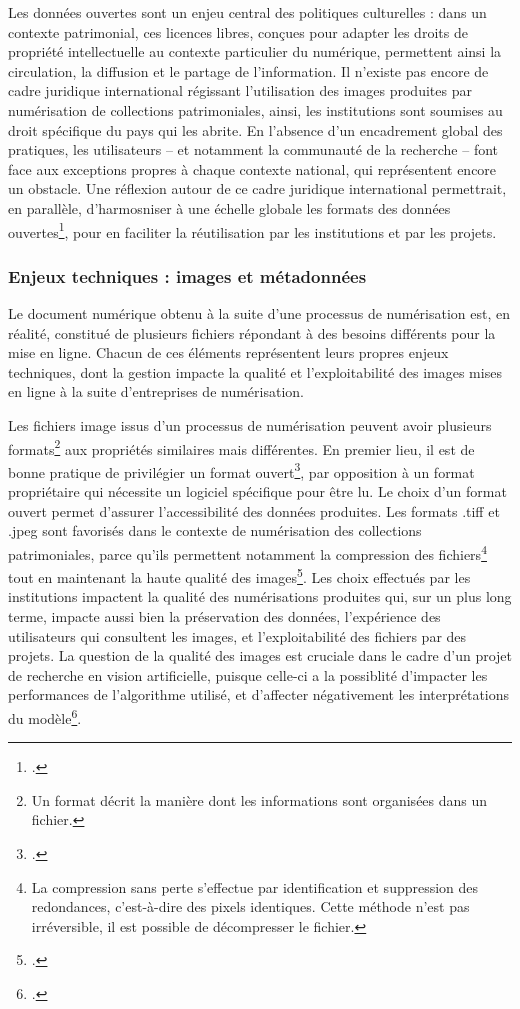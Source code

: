 Les données ouvertes sont un enjeu central des politiques culturelles : dans un contexte patrimonial, ces licences libres, conçues pour adapter les droits de propriété intellectuelle au contexte particulier du numérique, permettent ainsi la circulation, la diffusion et le partage de l'information. Il n'existe pas encore de cadre juridique international régissant l'utilisation des images produites par numérisation de collections patrimoniales, ainsi, les institutions sont soumises au droit spécifique du pays qui les abrite. En l'absence d'un encadrement global des pratiques, les utilisateurs -- et notamment la communauté de la recherche -- font face aux exceptions propres à chaque contexte national, qui représentent encore un obstacle. Une réflexion autour de ce cadre juridique international permettrait, en parallèle, d'harmosniser à une échelle globale les formats des données ouvertes\footcite{benhamouDroitAuteurMusees2016}, pour en faciliter la réutilisation par les institutions et par les projets.

        \subsubsection{Enjeux techniques : images et métadonnées}
Le document numérique obtenu à la suite d'une processus de numérisation est, en réalité, constitué de plusieurs fichiers répondant à des besoins différents pour la mise en ligne. Chacun de ces éléments représentent leurs propres enjeux techniques, dont la gestion impacte la qualité et l'exploitabilité des images mises en ligne à la suite d'entreprises de numérisation.

Les fichiers image issus d'un processus de numérisation peuvent avoir plusieurs formats\footnote{Un format décrit la manière dont les informations sont organisées dans un fichier.} aux propriétés similaires mais différentes. En premier lieu, il est de bonne pratique de privilégier un format ouvert\footcite{besseNumerisationMasseVers2019}, par opposition à un format propriétaire qui nécessite un logiciel spécifique pour être lu. Le choix d'un format ouvert permet d'assurer l'accessibilité des données produites. Les formats .tiff et .jpeg sont favorisés dans le contexte de numérisation des collections patrimoniales, parce qu'ils permettent notamment la compression des fichiers\footnote{La compression sans perte s'effectue par identification et suppression des redondances, c'est-à-dire des pixels identiques. Cette méthode n'est pas irréversible, il est possible de décompresser le fichier.} tout en maintenant la haute qualité des images\footcite{DigitalImages2020}. Les choix effectués par les institutions impactent la qualité des numérisations produites qui, sur un plus long terme, impacte aussi bien la préservation des données, l'expérience des utilisateurs qui consultent les images, et l'exploitabilité des fichiers par des projets. La question de la qualité des images est cruciale dans le cadre d'un projet de recherche en vision artificielle, puisque celle-ci a la possiblité d'impacter les performances de l'algorithme utilisé, et d'affecter négativement les interprétations du modèle\footcite{bergstromImageQualityComputer2023}.

